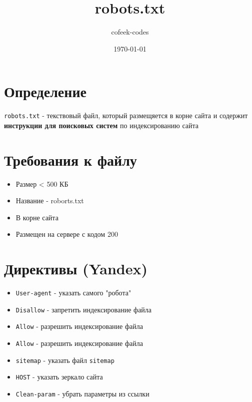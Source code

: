 \documentclass{article}
\title{robots.txt}
\author{cofeek-codes}
\date{\today}
\begin{document}
\maketitle

\section{Определение}

\texttt{robots.txt} - текствовый файл, который размещяется в корне сайта и содержит \textbf{инструкции для поисковых систем} по индексированию сайта

\section{Требования к файлу}

\begin{itemize}
    \item Размер < 500 КБ
    \item Название - roborts.txt
    \item В корне сайта
    \item Размещен на сервере с кодом 200
\end{itemize}

\section{Директивы (Yandex)}

\begin{itemize}
    \item \texttt{User-agent} - указать самого "робота"
    \item \texttt{Disallow} - запретить индексирование файла
    \item \texttt{Allow} - разрешить индексирование файла
    \item \texttt{Allow} - разрешить индексирование файла
    \item \texttt{sitemap} - указать файл \texttt{sitemap}
    \item \texttt{HOST} - указать зеркало сайта
    \item \texttt{Clean-param} - убрать параметры из ссылки
    
    
\end{itemize}
\end{document}
